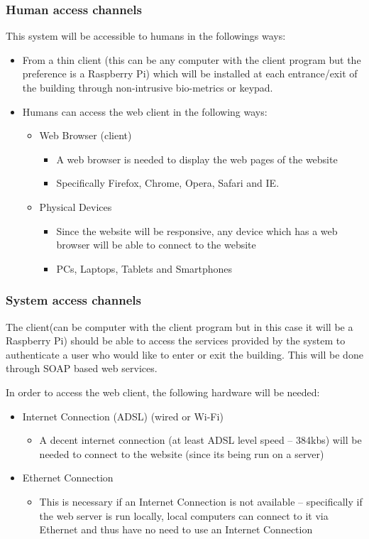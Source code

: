 \subsubsection{Human access channels}
This system will be accessible to humans in the followings ways:

	\begin{itemize}
		\item From a thin client (this can be any computer with the client program but the preference is a Raspberry Pi) which will be installed at each entrance/exit of the building through non-intrusive bio-metrics or keypad.
		\item Humans can access the web client in the following ways:
		\begin{itemize}
			\item Web Browser (client)
				\begin{itemize}
					\item A web browser is needed to display the web pages of the website
					\item Specifically Firefox, Chrome, Opera, Safari and IE.
				\end{itemize}
			\item Physical Devices
			\begin{itemize}
				\item Since the website will be responsive, any device which has a web browser will be able to connect to the website
				\item PCs, Laptops, Tablets and Smartphones
			\end{itemize}
		\end{itemize}
	\end{itemize}
	
\subsubsection{System access channels}
The client(can be computer with the client program but in this case it will be a Raspberry Pi) should be able to access the services provided by the system to authenticate a user who would like to enter or exit the building. This will be done through SOAP based web services.

In order to access the web client, the following hardware will be needed:
\begin{itemize}
	\item Internet Connection (ADSL) (wired or Wi-Fi)
	\begin{itemize}
		\item A decent internet connection (at least ADSL level speed – 384kbs) will be needed to connect to the website (since its being run on a server)
	\end{itemize}
	\item Ethernet Connection
	\begin{itemize}
		\item This is necessary if an Internet Connection is not available – specifically if the web server is run locally, local computers can connect to it via Ethernet and thus have no need to use an Internet Connection
	\end{itemize}
\end{itemize}

